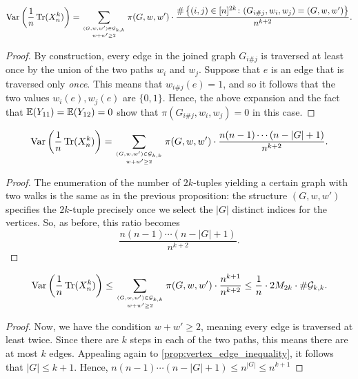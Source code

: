 

\begin{proposition}
  \label{prop:var_trace_as_sum}
  \notready
  \[ \operatorname{Var}\left( \frac1n\operatorname{Tr}(X_n^k)\right) = \sum_{(G,w,w')\in \mathcal{G}_{k,k}\atop w+w'\ge 2} \pi(G,w,w')\cdot\frac{\#\left\{(i,{j})\in [n]^{2k}\colon (G_{i\#j},w_{i},w_{j}) = (G,w,w')\right\}}{n^{k+2}}. \]
\end{proposition}

\begin{proof}
  \notready
  By construction, every edge in the joined graph $G_{{i}\#{j}}$ is traversed at least once by the union of the two paths $w_{i}$ and $w_{j}$.  Suppose that $e$ is an edge that is traversed only {\em once}.  This means that $w_{{i}\#{j}}(e) = 1$, and so it follows that the two values $w_{i}(e),w_{j}(e)$ are $\{0,1\}$.  Hence, the above expansion and the fact that $\mathbb{E}(Y_{11})=\mathbb{E}(Y_{12})=0$ show that $\pi(G_{{i}\#{j}},w_{i},w_{j}) = 0$ in this case.
\end{proof}


\begin{lemma}
  \label{lemma:simplified_var_trace_as_sum}
  \notready
  \[ \operatorname{Var}\left( \frac1n\operatorname{Tr}({X}_n^k)\right) = \sum_{(G,w,w')\in \mathcal{G}_{k,k}\atop w+w'\ge 2} \pi(G,w,w')\cdot\frac{n(n-1)\cdots (n-|G|+1)}{n^{k+2}}. \]
\end{lemma}

\begin{proof}
  \notready
  The enumeration of the number of $2k$-tuples yielding a certain graph with two walks is the same as in the previous proposition: the structure $(G,w,w')$ specifies the $2k$-tuple precisely once we select the $|G|$ distinct indices for the vertices.  So, as before, this ratio becomes \[ \frac{n(n-1)\cdots (n-|G|+1)}{n^{k+2}}. \]
\end{proof}

\begin{proposition}
  \label{prop:var_upper_bound}
  \notready
  \[ \operatorname{Var}\left( \frac1n\operatorname{Tr}({X}_n^k)\right) \le \sum_{(G,w,w')\in\mathcal{G}_{k,k}\atop w+w'\ge 2} \pi(G,w,w')\cdot \frac{n^{k+1}}{n^{k+2}} \le \frac1n\cdot 2M_{2k}\cdot \#\mathcal{G}_{k,k}. \]
\end{proposition}

\begin{proof}
  \notready
  Now, we have the condition $w+w'\ge 2$, meaning every edge is traversed at least twice.  Since there are $k$ steps in each of the two paths, this means there are at most $k$ edges.  Appealing again to \ref{prop:vertex_edge_inequality}, it follows that $|G|\le k+1$.  Hence, $n(n-1)\cdots(n-|G|+1) \le n^{|G|} \le n^{k+1}$
\end{proof}

